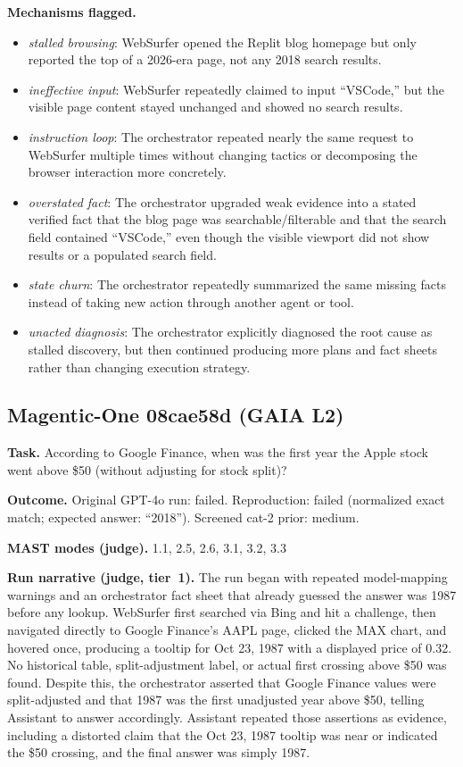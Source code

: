 \textbf{Mechanisms flagged.}
\begin{itemize}
  \item \emph{stalled browsing}: WebSurfer opened the Replit blog homepage but only reported the top of a 2026-era page, not any 2018 search results.
  \item \emph{ineffective input}: WebSurfer repeatedly claimed to input ``VSCode,'' but the visible page content stayed unchanged and showed no search results.
  \item \emph{instruction loop}: The orchestrator repeated nearly the same request to WebSurfer multiple times without changing tactics or decomposing the browser interaction more concretely.
  \item \emph{overstated fact}: The orchestrator upgraded weak evidence into a stated verified fact that the blog page was searchable/filterable and that the search field contained ``VSCode,'' even though the visible viewport did not show results or a populated search field.
  \item \emph{state churn}: The orchestrator repeatedly summarized the same missing facts instead of taking new action through another agent or tool.
  \item \emph{unacted diagnosis}: The orchestrator explicitly diagnosed the root cause as stalled discovery, but then continued producing more plans and fact sheets rather than changing execution strategy.
\end{itemize}

\subsection*{Magentic-One 08cae58d (GAIA L2)}
\textbf{Task.} According to Google Finance, when was the first year the Apple stock went above \$50 (without adjusting for stock split)?

\textbf{Outcome.} Original GPT-4o run: failed. Reproduction: failed (normalized exact match; expected answer: ``2018''). Screened cat-2 prior: medium.

\textbf{MAST modes (judge).} 1.1, 2.5, 2.6, 3.1, 3.2, 3.3

\textbf{Run narrative (judge, tier~1).} The run began with repeated model-mapping warnings and an orchestrator fact sheet that already guessed the answer was 1987 before any lookup. WebSurfer first searched via Bing and hit a challenge, then navigated directly to Google Finance's AAPL page, clicked the MAX chart, and hovered once, producing a tooltip for Oct 23, 1987 with a displayed price of 0.32. No historical table, split-adjustment label, or actual first crossing above \$50 was found. Despite this, the orchestrator asserted that Google Finance values were split-adjusted and that 1987 was the first unadjusted year above \$50, telling Assistant to answer accordingly. Assistant repeated those assertions as evidence, including a distorted claim that the Oct 23, 1987 tooltip was near or indicated the \$50 crossing, and the final answer was simply 1987.

